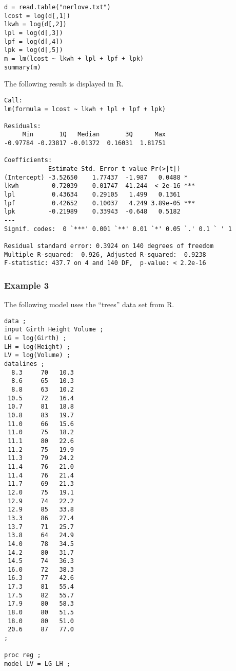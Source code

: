 \documentclass[12pt]{article}
\begin{document}
{\footnotesize\begin{verbatim}
d = read.table("nerlove.txt")
lcost = log(d[,1])
lkwh = log(d[,2])
lpl = log(d[,3])
lpf = log(d[,4])
lpk = log(d[,5])
m = lm(lcost ~ lkwh + lpl + lpf + lpk)
summary(m)
\end{verbatim}}

The following result is displayed in R.

{\footnotesize\begin{verbatim}
Call:
lm(formula = lcost ~ lkwh + lpl + lpf + lpk)

Residuals:
     Min       1Q   Median       3Q      Max 
-0.97784 -0.23817 -0.01372  0.16031  1.81751 

Coefficients:
            Estimate Std. Error t value Pr(>|t|)    
(Intercept) -3.52650    1.77437  -1.987   0.0488 *  
lkwh         0.72039    0.01747  41.244  < 2e-16 ***
lpl          0.43634    0.29105   1.499   0.1361    
lpf          0.42652    0.10037   4.249 3.89e-05 ***
lpk         -0.21989    0.33943  -0.648   0.5182    
---
Signif. codes:  0 `***' 0.001 `**' 0.01 `*' 0.05 `.' 0.1 ` ' 1

Residual standard error: 0.3924 on 140 degrees of freedom
Multiple R-squared:  0.926,	Adjusted R-squared:  0.9238 
F-statistic: 437.7 on 4 and 140 DF,  p-value: < 2.2e-16
\end{verbatim}}

\subsubsection*{Example 3}

The following model uses the ``trees'' data set from R.

{\footnotesize\begin{verbatim}
data ;
input Girth Height Volume ;
LG = log(Girth) ;
LH = log(Height) ;
LV = log(Volume) ;
datalines ;
  8.3     70   10.3
  8.6     65   10.3
  8.8     63   10.2
 10.5     72   16.4
 10.7     81   18.8
 10.8     83   19.7
 11.0     66   15.6
 11.0     75   18.2
 11.1     80   22.6
 11.2     75   19.9
 11.3     79   24.2
 11.4     76   21.0
 11.4     76   21.4
 11.7     69   21.3
 12.0     75   19.1
 12.9     74   22.2
 12.9     85   33.8
 13.3     86   27.4
 13.7     71   25.7
 13.8     64   24.9
 14.0     78   34.5
 14.2     80   31.7
 14.5     74   36.3
 16.0     72   38.3
 16.3     77   42.6
 17.3     81   55.4
 17.5     82   55.7
 17.9     80   58.3
 18.0     80   51.5
 18.0     80   51.0
 20.6     87   77.0
;

proc reg ;
model LV = LG LH ;
\end{verbatim}}
\end{document}
